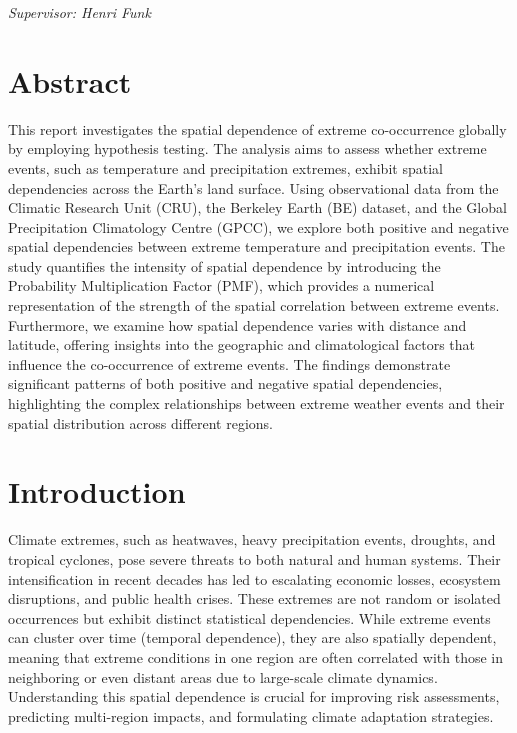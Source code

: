 \documentclass[
]{krantz}
\begin{document}
\emph{Supervisor: Henri Funk}

\section{Abstract}\label{abstract-3}

This report investigates the spatial dependence of extreme co-occurrence globally by employing hypothesis testing. The analysis aims to assess whether extreme events, such as temperature and precipitation extremes, exhibit spatial dependencies across the Earth's land surface. Using observational data from the Climatic Research Unit (CRU), the Berkeley Earth (BE) dataset, and the Global Precipitation Climatology Centre (GPCC), we explore both positive and negative spatial dependencies between extreme temperature and precipitation events. The study quantifies the intensity of spatial dependence by introducing the Probability Multiplication Factor (PMF), which provides a numerical representation of the strength of the spatial correlation between extreme events. Furthermore, we examine how spatial dependence varies with distance and latitude, offering insights into the geographic and climatological factors that influence the co-occurrence of extreme events. The findings demonstrate significant patterns of both positive and negative spatial dependencies, highlighting the complex relationships between extreme weather events and their spatial distribution across different regions.

\section{Introduction}\label{introduction-4}

Climate extremes, such as heatwaves, heavy precipitation events, droughts, and tropical cyclones, pose severe threats to both natural and human systems. Their intensification in recent decades has led to escalating economic losses, ecosystem disruptions, and public health crises. These extremes are not random or isolated occurrences but exhibit distinct statistical dependencies. While extreme events can cluster over time (temporal dependence), they are also spatially dependent, meaning that extreme conditions in one region are often correlated with those in neighboring or even distant areas due to large-scale climate dynamics. Understanding this spatial dependence is crucial for improving risk assessments, predicting multi-region impacts, and formulating climate adaptation strategies.
\end{document}
